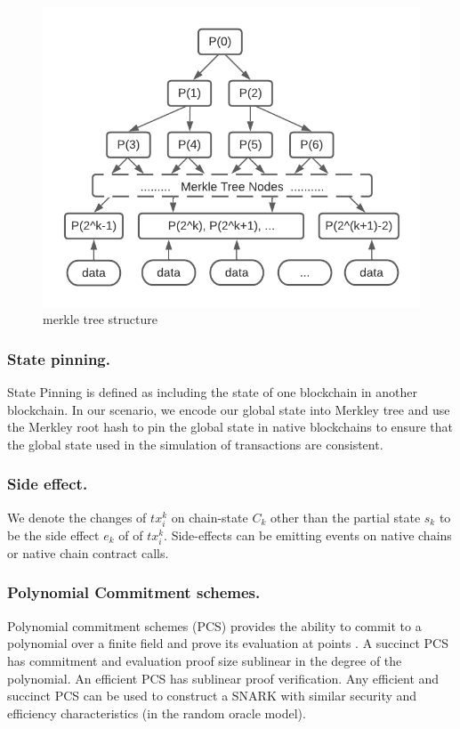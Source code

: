 \documentclass[pageno]{jpaper}
\begin{document}
\begin{figure}[!ht]
\caption{merkle tree structure}
\label{merkle-tree}
\includegraphics[scale=0.6]{merkle-tree}
\end{figure}

\subsubsection{State pinning.}
State Pinning \cite {robinson2019anonymous} is defined as including the state of one blockchain in another blockchain. In our scenario, we encode our global state into Merkley tree and use the Merkley root hash to pin the global state in native blockchains to ensure that the global state used in the simulation of transactions are consistent.
\\
\subsubsection{Side effect.}
We denote the changes of $tx_i^k$ on chain-state $C_k$ other than the partial state $s_k$ to be the side effect $e_k$ of of $tx_i^k$. Side-effects can be emitting events on native chains or native chain contract calls.
\\
\subsubsection{Polynomial Commitment schemes.}
Polynomial commitment schemes (PCS) provides the ability to commit to a polynomial over a finite field and prove its evaluation at points \cite{boneh2021halo}. A succinct PCS has commitment and evaluation proof size sublinear in the degree of the polynomial. An efficient PCS has sublinear proof verification. Any efficient and succinct PCS can be used to construct a SNARK with similar security and efficiency characteristics (in the random oracle model).
\\
\end{document}
